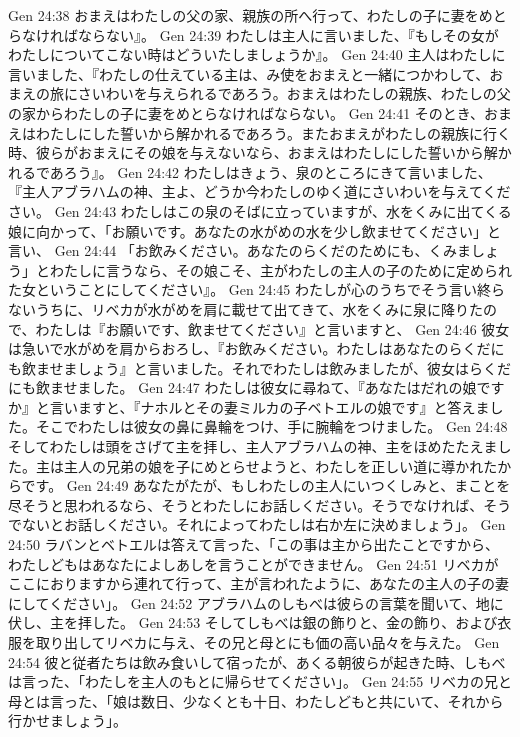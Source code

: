 Gen 24:38  おまえはわたしの父の家、親族の所へ行って、わたしの子に妻をめとらなければならない』。
Gen 24:39  わたしは主人に言いました、『もしその女がわたしについてこない時はどういたしましょうか』。
Gen 24:40  主人はわたしに言いました、『わたしの仕えている主は、み使をおまえと一緒につかわして、おまえの旅にさいわいを与えられるであろう。おまえはわたしの親族、わたしの父の家からわたしの子に妻をめとらなければならない。
Gen 24:41  そのとき、おまえはわたしにした誓いから解かれるであろう。またおまえがわたしの親族に行く時、彼らがおまえにその娘を与えないなら、おまえはわたしにした誓いから解かれるであろう』。
Gen 24:42  わたしはきょう、泉のところにきて言いました、『主人アブラハムの神、主よ、どうか今わたしのゆく道にさいわいを与えてください。
Gen 24:43  わたしはこの泉のそばに立っていますが、水をくみに出てくる娘に向かって、「お願いです。あなたの水がめの水を少し飲ませてください」と言い、
Gen 24:44  「お飲みください。あなたのらくだのためにも、くみましょう」とわたしに言うなら、その娘こそ、主がわたしの主人の子のために定められた女ということにしてください』。
Gen 24:45  わたしが心のうちでそう言い終らないうちに、リベカが水がめを肩に載せて出てきて、水をくみに泉に降りたので、わたしは『お願いです、飲ませてください』と言いますと、
Gen 24:46  彼女は急いで水がめを肩からおろし、『お飲みください。わたしはあなたのらくだにも飲ませましょう』と言いました。それでわたしは飲みましたが、彼女はらくだにも飲ませました。
Gen 24:47  わたしは彼女に尋ねて、『あなたはだれの娘ですか』と言いますと、『ナホルとその妻ミルカの子ベトエルの娘です』と答えました。そこでわたしは彼女の鼻に鼻輪をつけ、手に腕輪をつけました。
Gen 24:48  そしてわたしは頭をさげて主を拝し、主人アブラハムの神、主をほめたたえました。主は主人の兄弟の娘を子にめとらせようと、わたしを正しい道に導かれたからです。
Gen 24:49  あなたがたが、もしわたしの主人にいつくしみと、まことを尽そうと思われるなら、そうとわたしにお話しください。そうでなければ、そうでないとお話しください。それによってわたしは右か左に決めましょう」。
Gen 24:50  ラバンとベトエルは答えて言った、「この事は主から出たことですから、わたしどもはあなたによしあしを言うことができません。
Gen 24:51  リベカがここにおりますから連れて行って、主が言われたように、あなたの主人の子の妻にしてください」。
Gen 24:52  アブラハムのしもべは彼らの言葉を聞いて、地に伏し、主を拝した。
Gen 24:53  そしてしもべは銀の飾りと、金の飾り、および衣服を取り出してリベカに与え、その兄と母とにも価の高い品々を与えた。
Gen 24:54  彼と従者たちは飲み食いして宿ったが、あくる朝彼らが起きた時、しもべは言った、「わたしを主人のもとに帰らせてください」。
Gen 24:55  リベカの兄と母とは言った、「娘は数日、少なくとも十日、わたしどもと共にいて、それから行かせましょう」。
